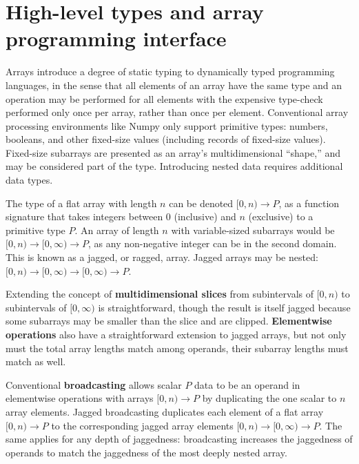 \documentclass{webofc}
\begin{document}


\section{High-level types and array programming interface}

Arrays introduce a degree of static typing to dynamically typed programming languages, in the sense that all elements of an array have the same type and an operation may be performed for all elements with the expensive type-check performed only once per array, rather than once per element. Conventional array processing environments like Numpy only support primitive types: numbers, booleans, and other fixed-size values (including records of fixed-size values). Fixed-size subarrays are presented as an array's multidimensional ``shape,'' and may be considered part of the type. Introducing nested data requires additional data types.

The type of a flat array with length $n$ can be denoted $[0, n) \to P$, as a function signature that takes integers between $0$ (inclusive) and $n$ (exclusive) to a primitive type $P$. An array of length $n$ with variable-sized subarrays would be $[0, n) \to [0, \infty) \to P$, as any non-negative integer can be in the second domain. This is known as a jagged, or ragged, array. Jagged arrays may be nested: $[0, n) \to [0, \infty) \to [0, \infty) \to P$.

Extending the concept of {\bf multidimensional slices} from subintervals of $[0, n)$ to subintervals of $[0, \infty)$ is straightforward, though the result is itself jagged because some subarrays may be smaller than the slice and are clipped. {\bf Elementwise operations} also have a straightforward extension to jagged arrays, but not only must the total array lengths match among operands, their subarray lengths must match as well.

Conventional {\bf broadcasting} allows scalar $P$ data to be an operand in elementwise operations with arrays $[0, n) \to P$ by duplicating the one scalar to $n$ array elements. Jagged broadcasting duplicates each element of a flat array $[0, n) \to P$ to the corresponding jagged array elements $[0, n) \to [0, \infty) \to P$. The same applies for any depth of jaggedness: broadcasting increases the jaggedness of operands to match the jaggedness of the most deeply nested array.
\end{document}
